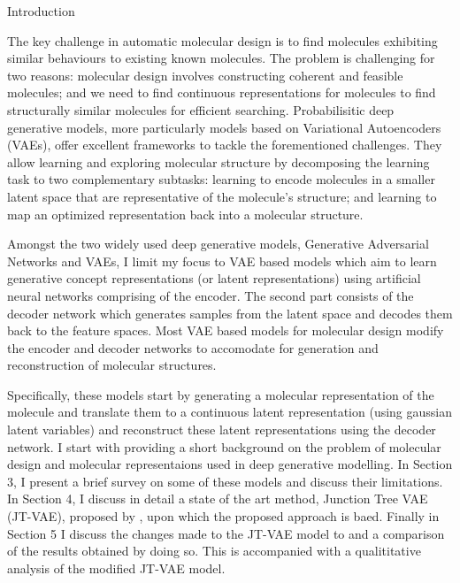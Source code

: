 \documentclass{article}
\begin{document}
\begin{psection}{Introduction}

	The key challenge in automatic molecular design is to find molecules exhibiting similar behaviours to existing known molecules. The problem is challenging for two reasons: molecular design involves constructing coherent and feasible molecules; and we need to find continuous representations for molecules to find structurally similar molecules for efficient searching. Probabilisitic deep generative models, more particularly models based on Variational Autoencoders (VAEs), offer excellent frameworks to tackle the forementioned challenges. They allow learning and exploring molecular structure by decomposing the learning task to two complementary subtasks: learning to encode molecules in a smaller latent space that are representative of the molecule's structure; and learning to map an optimized representation back into a molecular structure.

	Amongst the two widely used deep generative models, Generative Adversarial Networks and VAEs, I limit my focus to VAE based models which aim to learn generative concept representations (or latent representations) using artificial neural networks comprising of the encoder. The second part consists of the decoder network which generates samples from the latent space and decodes them back to the feature spaces. Most VAE based models for molecular design modify the encoder and decoder networks to accomodate for generation and reconstruction of molecular structures.

	Specifically, these models start by generating a molecular representation of the molecule and translate them to a continuous latent representation (using gaussian latent variables) and reconstruct these latent representations using the decoder network. I start with providing a short background on the problem of molecular design and molecular representaions used in deep generative modelling. In Section 3, I present a brief survey on some of these models and discuss their limitations. In Section 4, I discuss in detail a state of the art method, Junction Tree VAE (JT-VAE), proposed by \cite{jtvae}, upon which the proposed approach is baed. Finally in Section 5 I discuss the changes made to the JT-VAE model to and a comparison of the results obtained by doing so. This is accompanied with a qualititative analysis of the modified JT-VAE model.

\end{psection}
\end{document}
